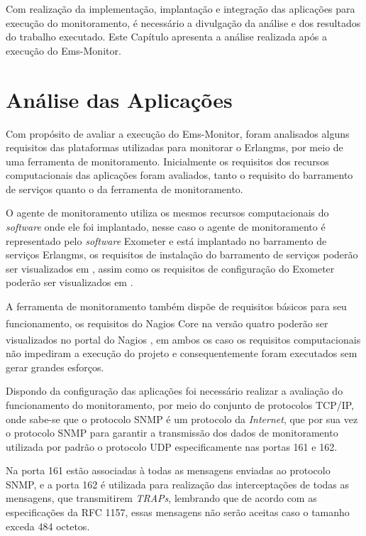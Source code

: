 \label{analise_monitoramento_servicos}

Com realização da implementação, implantação e integração das aplicações para execução do monitoramento, é necessário a divulgação da análise e dos resultados do trabalho executado. Este Capítulo apresenta a análise realizada após a execução do Ems-Monitor.


\section{Análise das Aplicações}
\label{analise}
Com propósito de avaliar a execução do Ems-Monitor, foram analisados alguns requisitos das plataformas utilizadas para monitorar o Erlangms, por meio de uma ferramenta de monitoramento. Inicialmente os requisitos dos recursos computacionais das aplicações foram avaliados, tanto o requisito do barramento de serviços quanto o da ferramenta de monitoramento. 

O agente de monitoramento utiliza os mesmos recursos computacionais do \textit{software} onde ele foi implantado, nesse caso o agente de monitoramento é representado pelo \textit{software} Exometer e está implantado no barramento de serviços Erlangms, os requisitos de instalação do barramento de serviços poderão ser visualizados em \cite{erlangms_gitHub}, assim como os requisitos de configuração do Exometer poderão ser visualizados em \cite{exometer_gitHub}. 

A ferramenta de monitoramento também dispõe de requisitos básicos para seu funcionamento, os requisitos do Nagios Core\textsuperscript{\textregistered} na versão quatro poderão ser visualizados no portal do Nagios\textsuperscript{\textregistered} \cite{nagios_core_configuration}, em ambos os caso os requisitos computacionais não impediram a execução do projeto e consequentemente foram executados sem gerar grandes esforços.

Dispondo da configuração das aplicações foi necessário realizar a avaliação do funcionamento do monitoramento, por meio do conjunto de protocolos TCP/IP, onde sabe-se que o protocolo \acrshort{SNMP} é um protocolo da \textit{Internet}, que por sua vez o protocolo \acrshort{SNMP} para garantir a transmissão dos dados de monitoramento utilizada por padrão o protocolo UDP especificamente nas portas 161 e 162. 

Na porta 161 estão associadas à todas as mensagens enviadas ao protocolo \acrshort{SNMP}, e a porta 162 é utilizada para realização das interceptações de todas as mensagens, que transmitirem \textit{TRAPs}, lembrando que de acordo com as especificações da RFC 1157, essas mensagens não serão aceitas caso o tamanho exceda 484 octetos\cite{Schoffstall}. 

